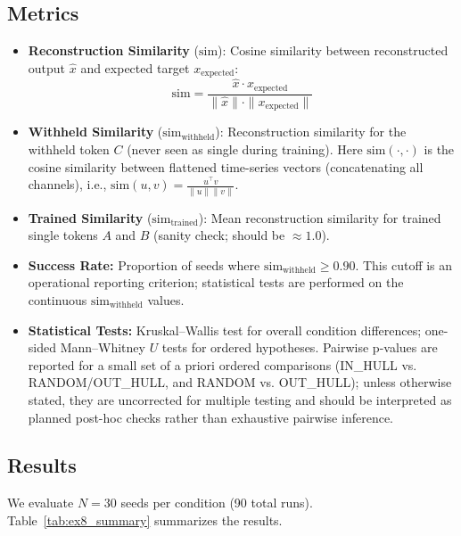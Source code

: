 \documentclass{article}
\begin{document}
\subsection{Metrics}
\begin{itemize}
    \item \textbf{Reconstruction Similarity} ($\mathrm{sim}$): Cosine similarity between reconstructed output $\hat{x}$ and expected target $x_{\text{expected}}$:
    \begin{equation}
        \mathrm{sim} = \frac{\hat{x} \cdot x_{\text{expected}}}{\|\hat{x}\| \cdot \|x_{\text{expected}}\|}
    \end{equation}
    \item \textbf{Withheld Similarity} ($\mathrm{sim}_{\text{withheld}}$): Reconstruction similarity for the withheld token $C$ (never seen as single during training). Here $\mathrm{sim}(\cdot,\cdot)$ is the cosine similarity between flattened time-series vectors (concatenating all channels), i.e., $\mathrm{sim}(u,v)=\frac{u^\top v}{\|u\|\|v\|}$.

    \item \textbf{Trained Similarity} ($\mathrm{sim}_{\text{trained}}$): Mean reconstruction similarity for trained single tokens $A$ and $B$ (sanity check; should be $\approx 1.0$).
    \item \textbf{Success Rate:} Proportion of seeds where $\mathrm{sim}_{\text{withheld}} \geq 0.90$. 
    This cutoff is an operational reporting criterion; statistical tests are performed on the continuous $\mathrm{sim}_{\text{withheld}}$ values.
    \item \textbf{Statistical Tests:} Kruskal--Wallis test for overall condition differences; one-sided Mann--Whitney $U$ tests for ordered hypotheses. Pairwise p-values are reported for a small set of a priori ordered comparisons (IN\_HULL vs. RANDOM/OUT\_HULL, and RANDOM vs. OUT\_HULL); unless otherwise stated, they are uncorrected for multiple testing and should be interpreted as planned post-hoc checks rather than exhaustive pairwise inference.

\end{itemize}

\subsection{Results}

We evaluate $N = 30$ seeds per condition (90 total runs).
Table~\ref{tab:ex8_summary} summarizes the results.
\end{document}
